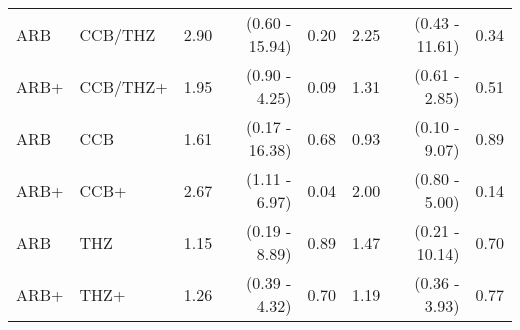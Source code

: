 \documentclass[11pt,]{article}
\begin{document}
\begin{table}[H]
{\begin{tabular}{llrrrrrr}
  ARB & CCB/THZ & 2.90 & (0.60 - 15.94) & 0.20 & 2.25 & (0.43 - 11.61) & 0.34 \\ 
  ARB+ & CCB/THZ+ & 1.95 & (0.90 - 4.25) & 0.09 & 1.31 & (0.61 - 2.85) & 0.51 \\ 
  ARB & CCB & 1.61 & (0.17 - 16.38) & 0.68 & 0.93 & (0.10 - 9.07) & 0.89 \\ 
  ARB+ & CCB+ & 2.67 & (1.11 - 6.97) & 0.04 & 2.00 & (0.80 - 5.00) & 0.14 \\ 
  ARB & THZ & 1.15 & (0.19 - 8.89) & 0.89 & 1.47 & (0.21 - 10.14) & 0.70 \\ 
  ARB+ & THZ+ & 1.26 & (0.39 - 4.32) & 0.70 & 1.19 & (0.36 - 3.93) & 0.77 \\ 
    \bottomrule
  \end{tabular}
  }
\end{table}
\begin{table}[H]
 \caption{Risk estimates for COVID-19 hospitalization across propensity score matched, prevalent-user cohorts in the CUIMC data source. We report uncalibrated and calibrated hazard ratios (HRs) and their 95\% confidence intervals (CIs). (+) indicates in-combination cohorts.}
\end{table}
\end{document}
